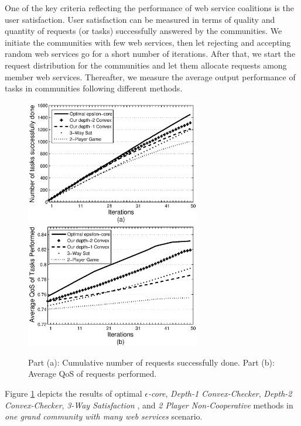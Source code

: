 One of the key criteria reflecting the performance of web service
coalitions is the user satisfaction. User satisfaction can be
measured in terms of quality and quantity of requests (or tasks)
successfully answered by the communities. We initiate the
communities with few web services, then let rejecting and
accepting random web services go for a short number of iterations.
After that, we start the request distribution for the communities
and let them allocate requests among member web services.
Thereafter, we measure the average output performance of tasks in
communities following different methods.

\begin{figure}[!t]
\centering
\includegraphics[width=3in]{Figures/task_done_opt.eps}
\includegraphics[width=3in]{Figures/task_qos_opt.eps}
\caption{Part (a): Cumulative number of requests successfully
done. Part (b): Average QoS of requests performed.}
\label{performanceall}
\end{figure}

Figure \ref{performanceall} depicts the results of optimal
\emph{$\epsilon$-core}, \emph{Depth-1 Convex-Checker},
\emph{Depth-2 Convex-Checker}, \emph{3-Way Satisfaction}
\cite{DBLP:conf/IEEEscc/LimTMB12}, and \emph{2 Player
Non-Cooperative} \cite{DBLP:conf/IEEEscc/KhosravifarABT11} methods
in \emph{one grand community with many web services} scenario.

